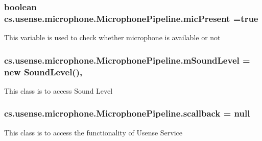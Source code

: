 \subsubsection[{mic\+Present}]{\setlength{\rightskip}{0pt plus 5cm}boolean cs.\+usense.\+microphone.\+Microphone\+Pipeline.\+mic\+Present =true\hspace{0.3cm}{\ttfamily [private]}}\label{classcs_1_1usense_1_1microphone_1_1_microphone_pipeline_ae8bb2c4509baf886e1ff2e77bae8356b}
This variable is used to check whether microphone is available or not \hypertarget{classcs_1_1usense_1_1microphone_1_1_microphone_pipeline_a3d812b7a892cd2752f523ad2a3fe40dc}{}
\subsubsection[{m\+Sound\+Level}]{ cs.\+usense.\+microphone.\+Microphone\+Pipeline.\+m\+Sound\+Level = new {\bf Sound\+Level}()\hspace{0.3cm}{\ttfamily [static]}, {\ttfamily [private]}}\label{classcs_1_1usense_1_1microphone_1_1_microphone_pipeline_a3d812b7a892cd2752f523ad2a3fe40dc}
This class is to access Sound Level \hypertarget{classcs_1_1usense_1_1microphone_1_1_microphone_pipeline_aa056fc73463dc36055dca68894c93a07}{}
\subsubsection[{scallback}]{ cs.\+usense.\+microphone.\+Microphone\+Pipeline.\+scallback = null\hspace{0.3cm}{\ttfamily [private]}}\label{classcs_1_1usense_1_1microphone_1_1_microphone_pipeline_aa056fc73463dc36055dca68894c93a07}
This class is to access the functionality of Usense Service \hypertarget{classcs_1_1usense_1_1microphone_1_1_microphone_pipeline_afa11d6538443e5f38bee7f74af2e12a3}{}
